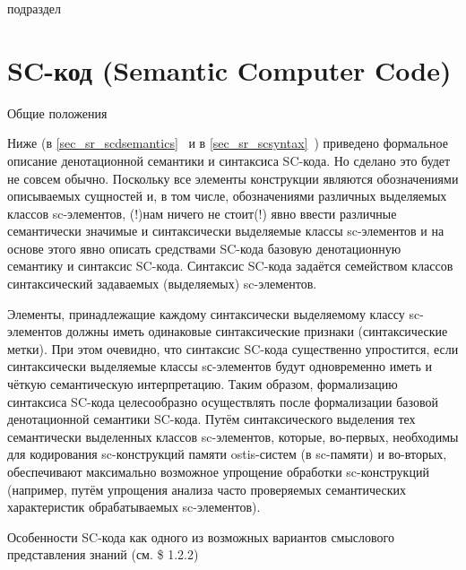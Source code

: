 
\begin{SCn}
	\begin{scnrelfromlist}{подраздел}
	\end{scnrelfromlist}
\end{SCn}


\section{SC-код (Semantic Computer Code)}
\label{sec_sr_sccode}
Общие положения

Ниже (в \ref{sec_sr_scdsemantics}~ и в \ref{sec_sr_scsyntax}~) приведено
формальное описание денотационной семантики
и синтаксиса SC-кода. Но сделано это будет не совсем обычно. Поскольку все элементы конструкции являются
обозначениями описываемых сущностей и, в том
числе, обозначениями различных выделяемых
классов sc-элементов, (!)нам ничего не стоит(!) явно
ввести различные семантически значимые и
синтаксически выделяемые классы sc-элементов и на основе этого явно описать
средствами SC-кода базовую денотационную
семантику и синтаксис SC-кода. 
Синтаксис SC-кода задаётся семейством классов
синтаксический задаваемых (выделяемых)
sc-элементов. 

Элементы, принадлежащие каждому
синтаксически выделяемому классу sc-элементов
должны иметь одинаковые синтаксические
признаки (синтаксические метки). 
При этом очевидно, что синтаксис SC-кода
существенно упростится, если синтаксически
выделяемые классы sс-элементов будут
одновременно иметь и чёткую семантическую
интерпретацию. Таким образом, формализацию
синтаксиса SC-кода целесообразно осуществлять
после формализации базовой денотационной
семантики SC-кода. Путём синтаксического
выделения тех семантически выделенных
классов sc-элементов, которые, во-первых,
необходимы для кодирования sc-конструкций
памяти ostis-систем (в sc-памяти) и во-вторых,
обеспечивают максимально возможное
упрощение обработки sc-конструкций (например,
путём упрощения анализа часто проверяемых
семантических характеристик обрабатываемых
sc-элементов).

Особенности SC-кода как одного из возможных
вариантов смыслового представления знаний 
(см. \$ 1.2.2) 

